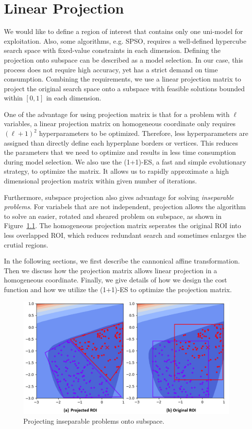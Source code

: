 \chapter{Linear Projection}
\label{chapter:projection} 

We would like to define a region of interest that contains only one uni-model for exploitation.
Also, some algorithms, e.g. SPSO, requires a well-defined hypercube search space with fixed-value constraints in each dimension.
Defining the projection onto subspace can be described as a model selection.
In our case, this process does not require high accuracy, yet has a strict demand on time consumption.
Combining the requirements, we use a linear projection matrix to project the original search space 
onto a subspace with feasible solutions bounded within $[0,1]$ in each dimension.

One of the advantage for using projection matrix is that for a problem with $\ell$ variables, 
a linear projection matrix on homogeneous coordinate only requires $(\ell+1)^2$ hyperparameters to be optimized.
Therefore, less hyperparameters are assigned than directly define each hyperplane borders or vertices.  
This reduces the parameters that we need to optimize and results in less time consumption during model selection.
We also use the (1+1)-ES, a fast and simple evolutionary strategy, to optimize the matrix.
It allows us to rapidly approximate a high dimensional projection matrix within given number of iterations.

Furthermore, subspace projection also gives advantage for solving \textit{inseparable problems}.
For variabels that are not independent, projection allows the algorithm
to solve an easier, rotated and sheared problem on subspace, as shown in Figure~\ref{fig:Projected_ROI}.
The homogeneous projection matrix seperates the original ROI into less overlapped ROI, 
which reduces redundant search and sometimes enlarges the crutial regions.

In the following sections, we first describe the cannonical affine transformation.
Then we discuss how the projection matrix allows linear projection in a homogeneous coordinate.
Finally, we give details of how we design the cost function and how we utilize the (1+1)-ES to optimize the projection matrix.

\begin{figure}
\centering
\includegraphics[width=\textwidth]{Projected_ROI}
\caption{Projecting inseparable problems onto subspace.}\label{fig:Projected_ROI}
\end{figure}

